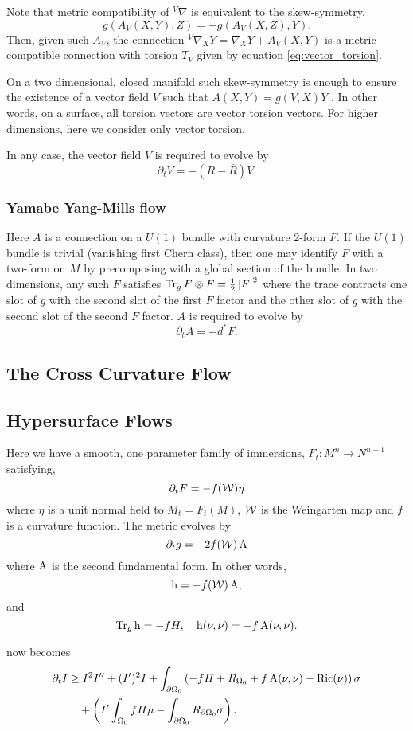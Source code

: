 \documentclass{amsart}
\begin{document}
Note that metric compatibility of $^{V}\nabla$ is equivalent to the skew-symmetry,
\[
g(A_V(X, Y), Z) = - g(A_V(X, Z), Y).
\]
Then, given such \(A_V\), the connection \(^{V}\nabla_X Y = \nabla_X Y + A_V(X, Y)\) is a metric compatible connection with torsion \(T_V\) given by equation \eqref{eq:vector_torsion}.

\begin{rem}
On a two dimensional, closed manifold such skew-symmetry is enough to ensure the existence of a vector field \(V\) such that \(A(X, Y) = g(V, X)Y\) \cite[Theorem 3.1]{MR712664}. In other words, on a surface, all torsion vectors are vector torsion vectors. For higher dimensions, here we consider only vector torsion.
\end{rem}

In any case, the vector field \(V\) is required to evolve by
\[
\partial_t V = -(R - \bar{R}) V.
\]

\subsubsection*{Yamabe Yang-Mills flow}

Here \(A\) is a connection on a \(U(1)\) bundle with curvature 2-form \(F\). If the \(U(1)\) bundle is trivial (vanishing first Chern class), then one may identify \(F\) with a two-form on \(M\) by precomposing with a global section of the bundle. In two dimensions, any such \(F\) satisfies \(\operatorname{Tr}_g F \otimes F = \tfrac{1}{2} \left|{F}\right|^2\) where the trace contracts one slot of \(g\) with the second slot of the first \(F\) factor and the other slot of \(g\) with the second slot of the second \(F\) factor. \(A\) is required to evolve by
\[
\partial_t A = -d^{\ast} F.
\]

\subsection{The Cross Curvature Flow}
\label{subsec:flows_xcf}

\subsection{Hypersurface Flows}
\label{subsec:flows_hypersurface}

Here we have a smooth, one parameter family of immersions, \(F_t : M^n \to N^{n+1}\) satisfying,
\[
\partial_t F = -f(\operatorname{\mathcal{W}}) \eta
\]
where \(\eta\) is a unit normal field to \(M_t = F_t(M)\), \(\operatorname{\mathcal{W}}\) is the Weingarten map and \(f\) is a curvature function. The metric evolves by
\[
\partial_t g = -2f(\operatorname{\mathcal{W}}) \operatorname{A}
\]
where \(\operatorname{A}\) is the second fundamental form. In other words,
\[
\operatorname{h} = -f(\operatorname{\mathcal{W}})\operatorname{A},
\]
and
\[
\operatorname{Tr}_g \operatorname{h} = -f H, \quad \operatorname{h} (\nu, \nu) = -f \operatorname{A}(\nu, \nu).
\]

 now becomes
\[
\begin{split}
\partial_t I &\geq I^2 I'' +  (I')^2 I + \int_{\partial {\Omega_0}} \left(-fH + R_{\Omega_0} + f\operatorname{A}(\nu, \nu) - \operatorname{Ric}(\nu)\right) \sigma \\
&\quad + \left(I'\int_{\Omega_0} fH \mu - \int_{\partial {\Omega_0}} R_{\partial {\Omega_0}}\sigma \right) .
\end{split}
\]

\printbibliography
\end{document}
